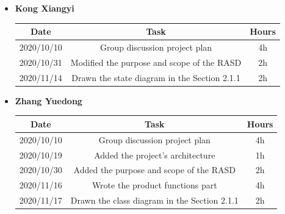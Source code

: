 \documentclass[a4paper,12pt]{book}
\begin{document}
\begin{itemize}
	\item \textbf{Kong Xiangyi}
	\begin{center}
		\begin{tabular}{ |c|c|c| } 
			\hline
			Date & Task & Hours \\
			\hline
			\hline
			2020/10/10 & Group discussion project plan & 4h \\ 
			\hline
			2020/10/31 & Modified the purpose and scope of the RASD & 2h \\ 
			\hline
			2020/11/14 & Drawn the state diagram in the Section 2.1.1 & 2h \\ 
			\hline
		\end{tabular}
	\end{center}
	\item \textbf{Zhang Yuedong}
	\begin{center}
		\begin{tabular}{ |c|c|c| } 
			\hline
			Date & Task & Hours \\
			\hline
			\hline
			2020/10/10 & Group discussion project plan & 4h \\ 
			\hline
			2020/10/19 & Added the project's architecture & 1h \\ 
			\hline
			2020/10/30 & Added the purpose and scope of the RASD & 2h \\ 
			\hline
			2020/11/16 & Wrote the product functions part & 4h \\ 
			\hline
			2020/11/17 & Drawn the class diagram in the Section 2.1.1  & 2h \\ 
			\hline
		\end{tabular}
	\end{center}
\end{itemize}


\backmatter
\end{document}

